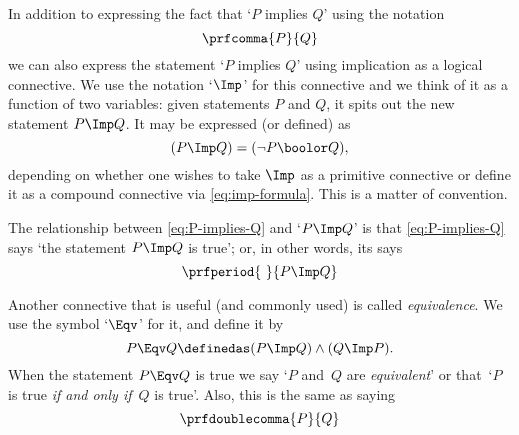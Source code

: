 In addition to expressing the fact that `$P$ implies $Q$' using the notation
\begin{equation}\label{eq:P-implies-Q}
    \prfcomma
    {P}{Q}
\end{equation}
we can also express the statement `$P$ implies $Q$' using implication as a logical connective. We use the notation `$\Imp$' for this connective and we think of it as a function of two variables: given statements $P$ and $Q$, it spits out the new statement $P \Imp Q$. It may be expressed (or defined) as 
\begin{equation}\label{eq:imp-formula}
(P \Imp Q) = (\lnot P \boolor Q),
\end{equation}
depending on whether one wishes to take $\Imp$ as a primitive connective or define it as a compound connective via \cref{eq:imp-formula}. This is a matter of convention. 

The relationship between \cref{eq:P-implies-Q} and `$P \Imp Q$' is that  \cref{eq:P-implies-Q} says `the statement $P \Imp Q$ is true'; or, in other words, its says
\begin{equation}
    \prfperiod
    {\ }{P \Imp Q}
\end{equation}

Another connective that is useful (and commonly used) is called \emph{equivalence}. We use the symbol `$\Eqv$' for it, and define it by
\begin{equation}
P \Eqv Q \definedas (P \Imp Q) \wedge (Q \Imp P).
\end{equation}
When the statement $P \Eqv Q$ is true we say `$P$ and~$Q$ are \emph{equivalent}' or that~`$P$ is true \emph{if and only if}~$Q$ is true'. Also, this is the same as saying 
\begin{equation*}
    \prfdoublecomma{
        P
    }{
        Q
    }
\end{equation*}
